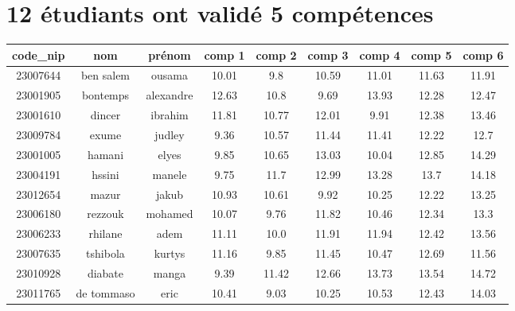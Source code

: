 \documentclass{article}%
\begin{document}
\section{12 étudiants ont validé 5 compétences}%
\label{sec:12tudiantsontvalid5comptences}%
\begin{tabular}{|c|c|c|c|c|c|c|c|c|}%
\hline%
\rowcolor{bleu}%
code\_nip&nom&prénom&comp 1&comp 2&comp 3&comp 4&comp 5&comp 6\\%
\hline%
23007644&ben salem&ousama&10.01&9.8&10.59&11.01&11.63&11.91\\%
\hline%
23001905&bontemps&alexandre&12.63&10.8&9.69&13.93&12.28&12.47\\%
\hline%
23001610&dincer&ibrahim&11.81&10.77&12.01&9.91&12.38&13.46\\%
\hline%
23009784&exume&judley&9.36&10.57&11.44&11.41&12.22&12.7\\%
\hline%
23001005&hamani&elyes&9.85&10.65&13.03&10.04&12.85&14.29\\%
\hline%
23004191&hssini&manele&9.75&11.7&12.99&13.28&13.7&14.18\\%
\hline%
23012654&mazur&jakub&10.93&10.61&9.92&10.25&12.22&13.25\\%
\hline%
23006180&rezzouk&mohamed&10.07&9.76&11.82&10.46&12.34&13.3\\%
\hline%
23006233&rhilane&adem&11.11&10.0&11.91&11.94&12.42&13.56\\%
\hline%
23007635&tshibola&kurtys&11.16&9.85&11.45&10.47&12.69&11.56\\%
\hline%
23010928&diabate&manga&9.39&11.42&12.66&13.73&13.54&14.72\\%
\hline%
23011765&de tommaso&eric&10.41&9.03&10.25&10.53&12.43&14.03\\%
\hline%
\end{tabular}

%
\end{document}
